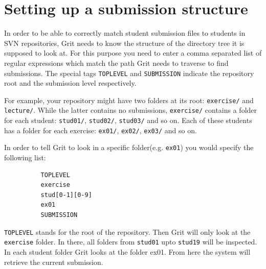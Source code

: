 \documentclass[10pt,a4paper, titlepage, toc=idx]{scrreprt}
\theoremstyle{definition}
\theoremstyle{plain}
\newcommand*{\product}{Grit}
\begin{document}
	\section{Setting up a submission structure}\label{structure}
        In order to be able to correctly match student submission
        files to students in SVN repositories, \product{} needs to
        know the structure of the directory tree it is supposed to
        look at. For this purpose you need to enter a comma separated
        list of regular expressions which match the path \product{}
        needs to traverse to find submissions. The special tags
        \texttt{TOPLEVEL} and \texttt{SUBMISSION} indicate the
        repository root and the submission level respectively.

        For example, your repository might have two folders at its
        root: \texttt{exercise/} and \texttt{lecture/}. While the
        latter contains no submissions, \texttt{exercise/} contains a
        folder for each student: \texttt{stud01/}, \texttt{stud02/},
        \texttt{stud03/} and so on. Each of these students has a
        folder for each exercise: \texttt{ex01/}, \texttt{ex02/},
        \texttt{ex03/} and so on.

        In order to tell \product{} to look in a specific folder(e.g. \texttt{ex01})
        you would specify the following list:

        \begin{lstlisting}
          TOPLEVEL
          exercise
          stud[0-1][0-9]
          ex01
          SUBMISSION
\end{lstlisting}

        \texttt{TOPLEVEL} stands for the root of the repository. Then
        \product{} will only look at the \texttt{exercise} folder. In
        there, all folders from \texttt{stud01} upto \texttt{stud19}
        will be inspected. In each student folder \product{} looks at the folder ex01. From
        here the system will retrieve the current submission.
        
\end{document}
